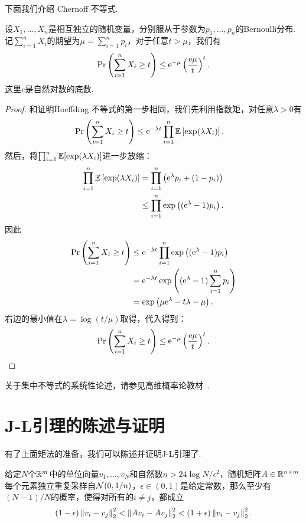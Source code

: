 下面我们介绍 Chernoff 不等式. 
\begin{theorem}\label{theorem:chernoff-inequality}
    设$X_1, \dots, X_n$是相互独立的随机变量，分别服从于参数为$p_1, \dots, p_n$的Bernoulli分布.  记$\sum_{i=1}^n X_i$的期望为$\mu = \sum_{i=1}^n p_i$，对于任意$t > \mu$，我们有
    \[
        \Pr\left( \sum_{i=1}^n X_i \geq t\right) \leq \mathrm{e}^{-\mu} \left(\frac{\mathrm{e}\mu}{t}\right)^t.  
    \]
    这里$e$是自然对数的底数.
\end{theorem}

\begin{proof}
和证明Hoeffding 不等式的第一步相同，我们先利用指数矩，对任意$\lambda > 0$有
    \[
    \begin{aligned}
        \Pr\left( \sum_{i=1}^n X_i \geq t\right) &\leq \mathrm{e}^{-\lambda t}\prod_{i=1}^n \mathbb{E}\left[\exp (\lambda X_i)\right].
    \end{aligned}
    \]
然后，将$\prod_{i=1}^n\mathbb{E}[\exp (\lambda X_i)]$进一步放缩：
    \[
    \begin{aligned}
        \prod_{i=1}^n \mathbb{E} \left[\exp (\lambda X_i)\right]&= \prod_{i=1}^n \left(\mathrm{e}^\lambda p_i + (1 - p_i) \right) \\
         &\leq \prod_{i=1}^n \exp\left((\mathrm{e}^\lambda -1)p_i \right). \\
    \end{aligned}
    \]
因此
    \[
    \begin{aligned}
        \Pr\left( \sum_{i=1}^n X_i \geq t\right) &\leq \mathrm{e}^{-\lambda t}\prod_{i=1}^n \exp\left((\mathrm{e}^\lambda -1)p_i \right) \\
        &= \mathrm{e}^{-\lambda t} \exp\left((\mathrm{e}^\lambda -1)\sum_{i=1}^n p_i \right)\\
        &=\exp\left(\mu \mathrm{e}^\lambda -t\lambda-\mu \right).
    \end{aligned}
    \]
右边的最小值在$\lambda = \log (t/\mu)$取得，代入得到：
    \[
    \begin{aligned}
        \Pr\left( \sum_{i=1}^n X_i \geq t\right) \leq \mathrm{e}^{-\mu} \left(\frac{\mathrm{e}\mu}{t}\right)^t.
    \end{aligned}
    \]
\end{proof}

\begin{remark}
    关于集中不等式的系统性论述，请参见高维概率论教材~\cite{vershyninHighDimensionalProbabilityIntroduction2018}.
\end{remark}

\section{J-L引理的陈述与证明}
有了上面矩法的准备，我们可以陈述并证明J-L引理了.
\begin{theorem}\label{theorem:johnson-lindenstrauss-lemma}
给定$N$个$\mathbb{R}^m$中的单位向量$v_1,\dots,v_N$和自然数$n >24\log N/\epsilon^2$，随机矩阵$A\in \mathbb{R}^{n\times m}$每个元素独立重复采样自$\mathcal{N}(0,1/n)$，$\epsilon \in (0,1)$是给定常数，那么至少有$(N-1)/N$的概率，使得对所有的$i\neq j$，都成立
    \[
        (1 - \epsilon)\left\|v_i-v_j\right\|_2^2 <\left\|Av_i-Av_j\right\|_2^2 < (1 + \epsilon)\left\|v_i-v_j\right\|_2^2.
    \]
\end{theorem}

